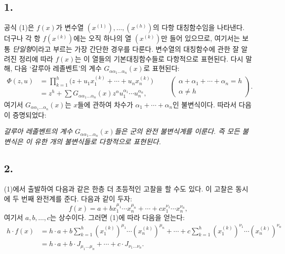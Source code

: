 \subsection*{1.}
공식 (1)은 $f(x)$가 변수열 $(x^{(1)}),\ldots,(x^{(h)})$의 다항 대칭함수임을 나타낸다. 더구나 각 항 $f(x^{(k)})$에는 오직 하나의 열 $(x^{(k)})$만 들어 있으므로, 여기서는 보통 \emph{단일형}이라고 부르는 가장 간단한 경우를 다룬다. 변수열의 대칭함수에 관한 잘 알려진 정리에 따라 $f(x)$는 이 열들의 기본대칭함수들로 다항적으로 표현된다. 다시 말해, 다음 ‘갈루아 레졸벤트’의 계수 $G_{\alpha\alpha_1\ldots\alpha_n}(x)$로 표현된다:
\[
\begin{aligned}
  \Phi(z,u)
  &=\prod_{k=1}^{h}\bigl(z+u_1x_1^{(k)}+\cdots+u_nx_n^{(k)}\bigr) \\
  &=z^h+
    \sum G_{\alpha\alpha_1\ldots\alpha_n}(x)
    z^{\alpha}u_1^{\alpha_1}\cdots u_n^{\alpha_n},
\end{aligned}
\qquad
\left(\begin{array}{c}
\alpha+\alpha_1+\cdots+\alpha_n=h\\
\alpha\ne h
\end{array}\right).
\]
여기서 $G_{\alpha\alpha_1\ldots\alpha_n}(x)$는 $x$들에 관하여 차수가 $\alpha_1+\cdots+\alpha_n$인 불변식이다. 따라서 다음이 증명되었다:

\emph{갈루아 레졸벤트의 계수 $G_{\alpha\alpha_1\ldots\alpha_n}(x)$들은 군의 완전 불변식계를 이룬다. 즉 모든 불변식은 이 유한 개의 불변식들로 다항적으로 표현된다.}

\subsection*{2.}
(1)에서 출발하여 다음과 같은 한층 더 초등적인 고찰을 할 수도 있다. 이 고찰은 동시에 두 번째 완전계를 준다. 다음과 같이 두자:
\[
  f(x)=a+b x_1^{\mu_1}\cdots x_n^{\mu_n}
       +\cdots+c x_1^{\nu_1}\cdots x_n^{\nu_n},
\]
여기서 $a,b,\ldots,c$는 상수이다. 그러면 (1)에 따라 다음을 얻는다:
\[
\begin{aligned}
 h\cdot f(x)
 &=h\cdot a+b\sum_{k=1}^{h}(x_1^{(k)})^{\mu_1}\cdots(x_n^{(k)})^{\mu_n}
     +\cdots
     +c\sum_{k=1}^{h}(x_1^{(k)})^{\nu_1}\cdots(x_n^{(k)})^{\nu_n} \\
 &=h\cdot a+b\cdot J_{\mu_1\ldots\mu_n}+\cdots+c\cdot J_{\nu_1\ldots\nu_n}.
\end{aligned}
\]

